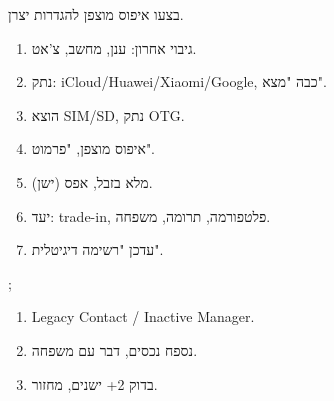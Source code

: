 \begin{tcbpractice}{בצעו איפוס מוצפן להגדרות יצרן.}
\begin{enumerate}
  \item גיבוי אחרון: ענן, מחשב, צ'אט.
  \item נתק: iCloud/Huawei/Xiaomi/Google, כבה "מצא".
  \item הוצא SIM/SD, נתק OTG.
  \item איפוס מוצפן, "פרמוט".
  \item (ישן) מלא בזבל, אפס.
  \item יעד: trade-in, פלטפורמה, תרומה, משפחה.
  \item עדכן "רשימה דיגיטלית".
\end{enumerate}

\end{tcbpractice}

\begin{tcbpractice}{;}
\begin{enumerate}
  \item Legacy Contact / Inactive Manager.
  \item נספח נכסים, דבר עם משפחה.
  \item בדוק 2+ ישנים, מחזור.
\end{enumerate}

\end{tcbpractice}
